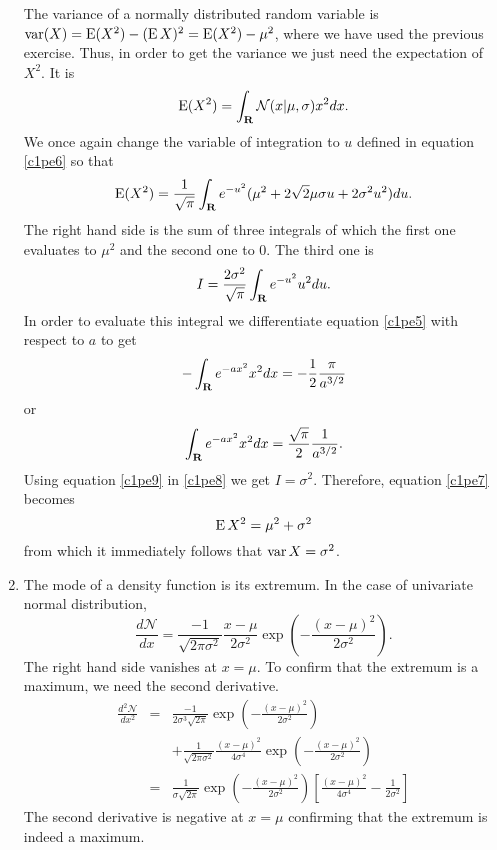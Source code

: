\begin{enumerate}
The variance of a normally distributed random variable is $\operatorname{var}(X) = \operatorname{E}(X^2) - (\operatorname{E} X)^2 
= \operatorname{E}(X^2) - \mu^2$, where we have used the previous exercise. Thus, in order to get the variance
we just need the expectation of $X^2$. It is
\[
\operatorname{E}(X^2) = \int_{\mathbf{R}}\mathcal{N}(x|\mu,\sigma)x^2dx.
\]
We once again change the variable of integration to $u$ defined in equation \eqref{c1pe6} so that
\begin{equation}\label{c1pe7}
\operatorname{E}(X^2) = \frac{1}{\sqrt{\pi}}\int_{\mathbf{R}} e^{-u^2}(\mu^2 + 2\sqrt{2}\mu\sigma u + 2\sigma^2u^2)du.
\end{equation}
The right hand side is the sum of three integrals of which the first one evaluates to $\mu^2$ and
the second one to $0$. The third one is
\begin{equation}\label{c1pe8}
I = \frac{2\sigma^2}{\sqrt{\pi}}\int_{\mathbf{R}} e^{-u^2}u^2du.
\end{equation}
In order to evaluate this integral we differentiate equation \eqref{c1pe5} with respect to $a$ to
get
\[
-\int_{\mathbf{R}} e^{-ax^2}x^2dx = -\frac{1}{2}\frac{\pi}{a^{3/2}}
\]
or
\begin{equation}\label{c1pe9}
\int_{\mathbf{R}} e^{-ax^2}x^2dx = \frac{\sqrt{\pi}}{2}\frac{1}{a^{3/2}}.
\end{equation}
Using equation \eqref{c1pe9} in \eqref{c1pe8} we get $I = \sigma^2$. Therefore, equation \eqref{c1pe7}
becomes
\[
\operatorname{E}{X^2} = \mu^2 + \sigma^2
\]
from which it immediately follows that $\operatorname{var}{X} = \sigma^2$.

\item The mode of a density function is its extremum. In the case of univariate normal distribution,
\[
\frac{d\mathcal{N}}{dx} = \frac{-1}{\sqrt{2\pi\sigma^2}}\frac{x - \mu}{2\sigma^2}\exp\left(-\frac{(x - \mu)^2}{2\sigma^2}\right).
\]
The right hand side vanishes at $x = \mu$. To confirm that the extremum is a maximum, we need the
second derivative.
\begin{eqnarray*}
\frac{d^2\mathcal{N}}{dx^2} &=& \frac{-1}{2\sigma^3\sqrt{2\pi}}\exp\left(-\frac{(x - \mu)^2}{2\sigma^2}\right) \\
 & & + \frac{1}{\sqrt{2\pi\sigma^2}}\frac{(x - \mu)^2}{4\sigma^4}\exp\left(-\frac{(x - \mu)^2}{2\sigma^2}\right) \\
 &=& \frac{1}{\sigma\sqrt{2\pi}}\exp\left(-\frac{(x - \mu)^2}{2\sigma^2}\right)\left[\frac{(x - \mu)^2}{4\sigma^4} - \frac{1}{2\sigma^2}\right]
\end{eqnarray*}
The second derivative is negative at $x = \mu$ confirming that the extremum is indeed a maximum.


\end{enumerate}
